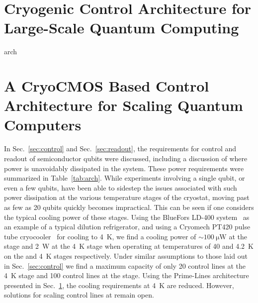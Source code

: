 \clearpage
\section{Cryogenic Control Architecture for Large-Scale Quantum Computing}
\label{sec:primelines}
{arch}

\clearpage
\section[A CryoCMOS Based Control Architecture for Scaling Quantum Computers]{A CryoCMOS Based Control Architecture for Scaling Quantum Computers}
\label{sec:gooseberry}
\begingroup
  \addtocounter{footnote}{-1}
  \renewcommand\thefootnote{}
\endgroup

In Sec.~\ref{sec:control} and Sec.~\ref{sec:readout}, the requirements for control and readout of semiconductor qubits were discussed, including a discussion
of where power is unavoidably dissipated in the system. These power requirements were summarized in Table~\ref{tab:arch}. While experiments involving a single qubit, or even a few qubits, have been able to sidestep the issues associated with such power dissipation at the various temperature stages of the cryostat, moving past as few as 20 qubits quickly becomes impractical. This can be seen if one considers the typical cooling power of these stages. Using the BlueFors LD-400 system~\cite{bluefors}
as an example of a typical dilution refrigerator, and using a Cryomech PT420 pulse tube cryocooler~\cite{cryomech} for cooling
to \SI{4}{\kelvin}, we find a cooling power of $\sim \SI{100}{\micro\watt}$ at the \si{\mk} stage and \SI{2}{\watt} at the \SI{4}{\kelvin} stage when operating at
temperatures of \SI{40}{\mk} and \SI{4.2}{\kelvin} on the \si{\mk} and \SI{4}{\kelvin} stages respectively. Under similar assumptions to those laid out in Sec.~\ref{sec:control} we find a maximum capacity of only 20 control lines at the \SI{4}{\kelvin} stage and 100 control lines at the \si{\mk} stage. Using the Prime-Lines architecture presented in Sec.~\ref{sec:primelines}, the cooling requirements at \SI{4}{\kelvin} are reduced. However, solutions for scaling control lines at \si{\mk} remain open.

